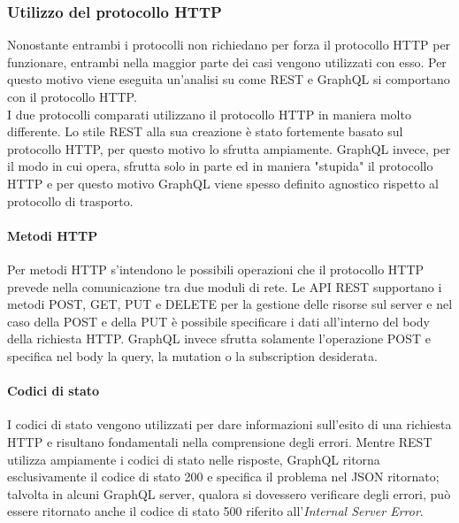 \subsubsection{Utilizzo del protocollo HTTP}
Nonostante entrambi i protocolli non richiedano per forza il protocollo HTTP per funzionare, entrambi nella maggior parte dei casi vengono utilizzati con esso. Per questo motivo viene eseguita un'analisi su come REST e GraphQL si comportano con il protocollo HTTP. \\
I due protocolli comparati utilizzano il protocollo HTTP in maniera molto differente. Lo stile REST alla sua creazione è stato fortemente basato sul protocollo HTTP, per questo motivo lo sfrutta ampiamente. GraphQL invece, per il modo in cui opera, sfrutta solo in parte ed in maniera "stupida" il protocollo HTTP e per questo motivo GraphQL viene spesso definito agnostico rispetto al protocollo di trasporto.
\paragraph{Metodi HTTP}
Per metodi HTTP s'intendono le possibili operazioni che il protocollo HTTP prevede nella comunicazione tra due moduli di rete. Le API REST supportano i metodi POST, GET, PUT e DELETE per la gestione delle risorse sul server e nel caso della POST e della PUT è possibile specificare i dati all'interno del body della richiesta HTTP. GraphQL invece sfrutta solamente l'operazione POST e specifica nel body la query, la mutation o la subscription desiderata.
\paragraph{Codici di stato}
I codici di stato vengono utilizzati per dare informazioni sull'esito di una richiesta HTTP e risultano fondamentali nella comprensione degli errori. Mentre REST utilizza ampiamente i codici di stato nelle risposte, GraphQL ritorna esclusivamente il codice di stato 200 e specifica il problema nel JSON ritornato; talvolta in alcuni GraphQL server, qualora si dovessero verificare degli errori, può essere ritornato anche il codice di stato 500 riferito all'\textit{Internal Server Error}.
